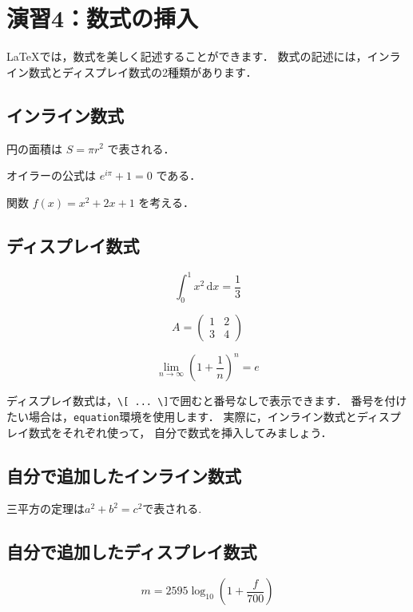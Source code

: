 \documentclass[a4paper,twocolumn]{jsarticle}
\newcommand{\dif}{\mathrm{d}}
\begin{document}
\section*{演習4：数式の挿入}
LaTeXでは，数式を美しく記述することができます．
数式の記述には，インライン数式とディスプレイ数式の2種類があります．

\subsection*{インライン数式}
円の面積は $S=\pi r^2$ で表される．

オイラーの公式は $e^{i\pi}+1=0$ である．

関数 $f(x)=x^2+2x+1$ を考える．

\subsection*{ディスプレイ数式}
\begin{equation}
\int_{0}^{1} x^2\,\dif x=\frac{1}{3}
\label{eq:integral}
\end{equation}

\begin{equation}
A=
\begin{pmatrix}
1 & 2\\
3 & 4
\end{pmatrix}
\label{eq:matrix}
\end{equation}

\begin{equation}
\lim_{n\to\infty}
\left(1+\frac{1}{n}\right)^n=e
\label{eq:euler}
\end{equation}

ディスプレイ数式は，\verb|\[ ... \]|で囲むと番号なしで表示できます．
番号を付けたい場合は，\verb|equation|環境を使用します．
実際に，インライン数式とディスプレイ数式をそれぞれ使って，
自分で数式を挿入してみましょう．


\subsection{自分で追加したインライン数式}
三平方の定理は$a^2 + b^2 = c^2$で表される.

\subsection{自分で追加したディスプレイ数式}
\begin{equation}
m = 2595 \log_{10}\left(1+\frac{f}{700}\right)
\label{eq:mel}
\end{equation}
\end{document}
